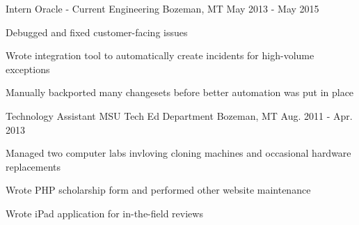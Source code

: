 \begin{cventries}
  \cventry
    {Intern} %
    {Oracle - Current Engineering} %
    {Bozeman, MT} %
    {May 2013 - May 2015} %
    {
      \begin{cvitems} %
        \item {Debugged and fixed customer-facing issues}
        \item {Wrote integration tool to automatically create incidents for high-volume exceptions}
        \item {Manually backported many changesets before better automation was put in place}
      \end{cvitems}
    }

  \cventry
    {Technology Assistant} %
    {MSU Tech Ed Department} %
    {Bozeman, MT} %
    {Aug. 2011 - Apr. 2013} %
    {
      \begin{cvitems} %
        \item {Managed two computer labs invloving cloning machines and occasional hardware replacements}
        \item {Wrote PHP scholarship form and performed other website maintenance}
        \item {Wrote iPad application for in-the-field reviews}
      \end{cvitems}
    }

\end{cventries}
